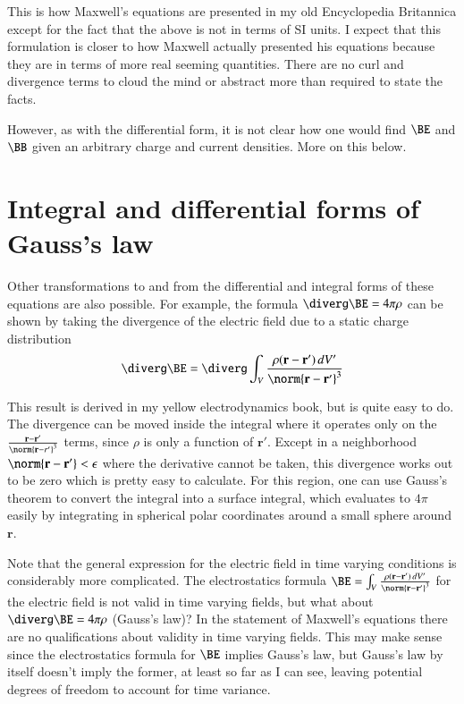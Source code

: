 This is how 
Maxwell's equations are presented in my old 
Encyclopedia Britannica 
except for the fact that 
the above is not in terms of SI units.  I expect that this formulation is closer to how 
Maxwell actually presented his equations because they are in terms of more real 
seeming quantities.  There are no curl and divergence terms to cloud the mind or
abstract more than required to state the facts.

However, as with the differential form, it is not clear how one would find
$\BE$ and $\BB$ given an arbitrary charge and current densities.  More on 
this below.

\section{Integral and differential forms of Gauss's law}

Other transformations to and from the differential and integral forms of these
equations are also possible.  For example, the formula $\diverg \BE = 4\pi\rho$ 
can be shown by taking the divergence of the electric field due to a static
charge distribution
\begin{equation*}
\diverg \BE = \diverg \int_V{\frac{\rho (\mathbf{r - r'})\,dV'}{\norm{\mathbf r - \mathbf r'}^3}}
\end{equation*}

This result is derived in my yellow electrodynamics book, but is quite easy to 
do.  The divergence can be moved inside the integral where it operates only on 
the $\frac {\mathbf{r - r'}} {\norm{\mathbf r - r'}^3}$ terms, since $\rho$ is 
only a function of $\mathbf r'$.  
Except in a neighborhood 
$\norm{\mathbf{r - r'}} < \epsilon$
where the derivative cannot be taken,
this divergence works out to be zero which is pretty easy to calculate.
For this region, one can use Gauss's theorem to convert the 
integral into a surface integral, which evaluates to $4\pi$ easily by integrating in spherical polar coordinates
around a small sphere around $\mathbf r$.

Note that the general expression for the 
electric field in time varying conditions is considerably more complicated.
The electrostatics formula 
$\BE = \int_V{\frac{\rho (\mathbf{r - r'})\,dV'}{\norm{\mathbf r - \mathbf r'}^3}}$
for the electric field is not valid in time 
varying fields, but what 
about $\diverg \BE = 4\pi\rho$ (Gauss's law)?  In the statement of Maxwell's equations
there are no qualifications about validity in time varying fields.  This may
make sense since the electrostatics formula for $\BE$ implies Gauss's law, 
but Gauss's law by itself doesn't imply the former, at least so far as I can
see, leaving potential 
degrees of freedom to account for time variance.

